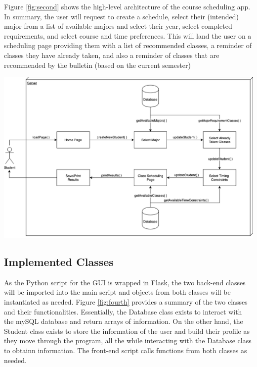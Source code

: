 \documentclass[a4paper, 11.5 pt, conference]{ieeeconf}  %
\begin{document}
Figure \ref{fig:second} shows the high-level architecture of the course scheduling app. In summary, the user will request to create a schedule, select their (intended) major from a list of available majors and select their year, select completed requirements, and select course and time preferences. This will land the user on a scheduling page providing them with a list of recommended classes, a reminder of classes they have already taken, and also a reminder of classes that are recommended by the bulletin (based on the current semester) 

\begingroup
    \medskip
    \centering
    \includegraphics[width=\columnwidth]{images/full-system.png}
    \label{fig:second}
    \medskip
\endgroup

\subsection{Implemented Classes}
As the Python script for the GUI is wrapped in Flask, the two back-end classes will be imported into the main script and objects from both classes will be instantiated as needed. Figure \ref{fig:fourth} provides a summary of the two classes and their functionalities. Essentially, the Database class exists to interact with the mySQL database and return arrays of information. On the other hand, the Student class exists to store the information of the user and build their profile as they move through the program, all the while interacting with the Database class to obtainn information. The front-end script calls functions from both classes as needed.
\end{document}
